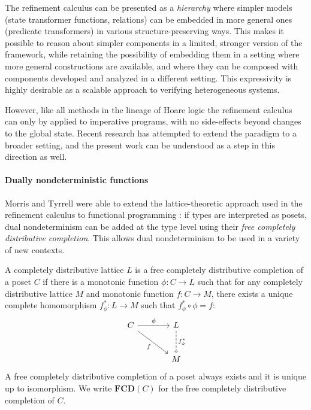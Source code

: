 \documentclass[sigplan,screen]{acmart}
\begin{document}
The refinement calculus can be presented as a \emph{hierarchy}
where simpler models (state transformer functions, relations)
can be embedded in more general ones (predicate transformers)
in various structure-preserving ways.
This makes it possible to reason about simpler components
in a limited, stronger version of the framework,
while retaining the possibility of embedding them
in a setting
where more general constructions are available,
and where they can be composed with components
developed and analyzed in a different setting.
This expressivity is highly desirable
as a scalable approach to
verifying heterogeneous systems.

However,
like all methods in the lineage of Hoare logic
the refinement calculus can only by applied to imperative programs,
with no side-effects beyond changes to the global state.
Recent research has attempted to extend the paradigm
to a broader setting,
and the present work can be understood
as a step in this direction as well.


\paragraph{Dually nondeterministic functions} %

Morris and Tyrrell were able to extend
the lattice-theoretic approach used in the refinement calculus
to functional programming
\cite{augtyp,dndf,cspdnd}:
if types are interpreted as posets,
dual nondeterminism can be added at the type level
using their \emph{free completely distributive completion}.
This allows dual nondeterminism to be used
in a variety of new contexts.

A completely distributive lattice $L$ is a
free completely distributive completion of
a poset $C$ if there is
a monotonic function $\phi : C \rightarrow L$
such that
for any completely distributive lattice $M$
and monotonic function $f : C \rightarrow M$,
there exists a unique complete homomorphism $f^*_\phi : L \rightarrow M$
such that $f^*_\phi \circ \phi = f$:
\[
  \begin{tikzcd}[sep=large]
    C \arrow[r, "\phi"] \arrow[rd, "f"'] &
    L \arrow[d, "f^*_\phi", dashed] \\ & M
  \end{tikzcd}
\]
A free completely distributive completion of a poset
always exists and it is unique up to isomorphism.
We write $\mathbf{FCD}(C)$ for
the free completely distributive completion of $C$.
\end{document}
